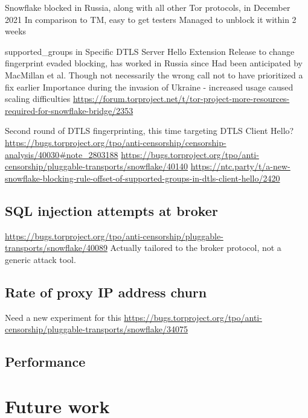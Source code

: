 \documentclass[letterpaper,twocolumn]{article}
\begin{document}
Snowflake blocked in Russia, along with all other Tor protocols,
in December 2021 \cite{ooni-2021-russia-blocks-tor}
In comparison to TM, easy to get testers
Managed to unblock it within 2 weeks

supported\_groups in Specific DTLS Server Hello Extension
Release to change fingerprint evaded blocking, has worked in Russia since
Had been anticipated by MacMillan et al.\cite[\S 3]{arxiv.2008.03254}
Though not necessarily the wrong call not to have prioritized a fix earlier
Importance during the invasion of Ukraine
- increased usage caused scaling difficulties
  \url{https://forum.torproject.net/t/tor-project-more-resources-required-for-snowflake-bridge/2353}

Second round of DTLS fingerprinting, this time targeting DTLS Client Hello?
\url{https://bugs.torproject.org/tpo/anti-censorship/censorship-analysis/40030#note_2803188}
\url{https://bugs.torproject.org/tpo/anti-censorship/pluggable-transports/snowflake/40140}
\url{https://ntc.party/t/a-new-snowflake-blocking-rule-offset-of-supported-groups-in-dtls-client-hello/2420}

\subsection{SQL injection attempts at broker}


\url{https://bugs.torproject.org/tpo/anti-censorship/pluggable-transports/snowflake/40089}
Actually tailored to the broker protocol, not a generic attack tool.

\subsection{Rate of proxy IP address churn}


Need a new experiment for this
\url{https://bugs.torproject.org/tpo/anti-censorship/pluggable-transports/snowflake/34075}

\subsection{Performance}
\label{sec:performance}


\section{Future work}
\end{document}
